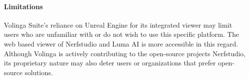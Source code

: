 \paragraph{Limitations}
Volinga Suite's reliance on Unreal Engine for its integrated viewer may limit users who are unfamiliar with or do not wish to use this specific platform.
The web based viewer of Nerfstudio and Luma AI is more accessible in this regard.
Although Volinga is actively contributing to the open-source projects Nerfstudio, its proprietary nature may also deter users or organizations that prefer open-source solutions.
